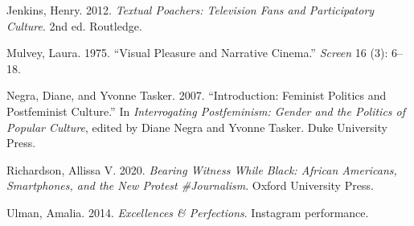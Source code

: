 \documentclass[
  letterpaper,
  DIV=11,
  numbers=noendperiod]{scrartcl}
\newlength{\cslhangindent}
\newenvironment{CSLReferences}[2] %
 {\begin{list}{}{%
  \setlength{\itemindent}{0pt}
  \setlength{\leftmargin}{0pt}
  \setlength{\parsep}{0pt}
  \ifodd #1
   \setlength{\leftmargin}{\cslhangindent}
   \setlength{\itemindent}{-1\cslhangindent}
  \fi
  \setlength{\itemsep}{#2\baselineskip}}}
 {\end{list}}
\begin{document}
\begin{CSLReferences}{1}{1}
Jenkins, Henry. 2012. \emph{Textual Poachers: Television Fans and
Participatory Culture}. 2nd ed. Routledge.

Mulvey, Laura. 1975. {``Visual Pleasure and Narrative Cinema.''}
\emph{Screen} 16 (3): 6--18.

Negra, Diane, and Yvonne Tasker. 2007. {``Introduction: Feminist
Politics and Postfeminist Culture.''} In \emph{Interrogating
Postfeminism: Gender and the Politics of Popular Culture}, edited by
Diane Negra and Yvonne Tasker. Duke University Press.

Richardson, Allissa V. 2020. \emph{Bearing Witness While Black: African
Americans, Smartphones, and the New Protest \#Journalism}. Oxford
University Press.

Ulman, Amalia. 2014. \emph{Excellences \& Perfections}. Instagram
performance.

\end{CSLReferences}
\end{document}
